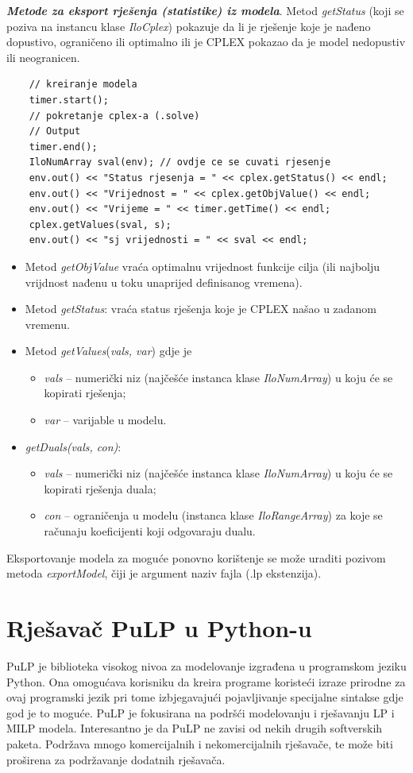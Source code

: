 \documentclass[a4paper, utf8, 11pt, colorlinks]{book}
\begin{document}
 \noindent \textbf{\emph{Metode za eksport rješenja (statistike) iz modela}}. Metod \emph{getStatus} (koji se poziva na instancu klase \emph{IloCplex})  pokazuje da li je rješenje koje je nađeno dopustivo, ograničeno ili optimalno ili je CPLEX pokazao da je model nedopustiv ili neogranicen.
 
 \begin{verbatim}
 	// kreiranje modela 
 	timer.start();
 	// pokretanje cplex-a (.solve)
 	// Output
 	timer.end();
 	IloNumArray sval(env); // ovdje ce se cuvati rjesenje
 	env.out() << "Status rjesenja = " << cplex.getStatus() << endl;
 	env.out() << "Vrijednost = " << cplex.getObjValue() << endl;
 	env.out() << "Vrijeme = " << timer.getTime() << endl;
 	cplex.getValues(sval, s);
 	env.out() << "sj vrijednosti = " << sval << endl;
 \end{verbatim}
\begin{itemize}
	\item Metod \emph{getObjValue} vraća optimalnu vrijednost funkcije cilja (ili najbolju vrijdnost nađenu u toku unaprijed definisanog vremena).
	\item Metod \emph{getStatus}: vraća status rješenja koje je CPLEX našao u zadanom vremenu.
	\item Metod \emph{getValues}(\emph{vals, var}) gdje je 
	\begin{itemize}
	 	  \item \emph{vals} -- numerički niz (najčešće instanca klase \emph{IloNumArray}) u koju će se kopirati rješenja;    
          \item \emph{var} -- varijable u modelu.
    \end{itemize}
     \item \emph{getDuals(vals, con)}:
     \begin{itemize}
     	\item \emph{vals} -- numerički niz (najčešće instanca klase \emph{IloNumArray}) u koju će se kopirati rješenja duala;
     	\item \emph{con} -- ograničenja u modelu (instanca klase \emph{IloRangeArray}) za koje se računaju koeficijenti koji odgovaraju dualu. 
     \end{itemize}
\end{itemize}
Eksportovanje modela za moguće ponovno korištenje se može uraditi pozivom metoda \emph{exportModel}, čiji je argument naziv fajla (.lp ekstenzija).  
 \section{Rješavač PuLP u Python-u}
 PuLP je biblioteka visokog nivoa za modelovanje izgrađena u programskom jeziku Python.  
 Ona omogućava korisniku da kreira programe koristeći izraze prirodne za ovaj programski jezik 
 pri tome izbjegavajući pojavljivanje specijalne sintakse gdje god je to moguće. PuLP je fokusirana na podršći modelovanju i rješavanju LP i MILP modela. Interesantno je da PuLP 
 ne zavisi od nekih drugih softverskih paketa.   Podržava mnogo komercijalnih i nekomercijalnih rješavače, te može biti proširena za podržavanje dodatnih rješavača. 
 
\end{document}
